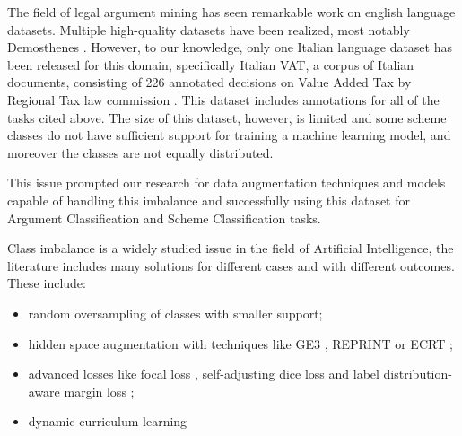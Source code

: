 \documentclass[11pt]{article}
\begin{document}

The field of legal argument mining has seen remarkable work on english language datasets. Multiple high-quality datasets have been realized, most notably Demosthenes \cite{grundler-etal-2022-detecting}.
However, to our knowledge, only one Italian language dataset has been released for this domain, specifically Italian VAT, a corpus of Italian documents, consisting of 226 annotated decisions on Value Added Tax by Regional Tax law commission \cite{galli2022}. This dataset includes annotations for all of the tasks cited above. The size of this dataset, however, is limited and some scheme classes do not have sufficient support for training a machine learning model, and moreover the classes are not equally distributed.

This issue prompted our research for data augmentation techniques and models capable of handling this imbalance and successfully using this dataset for Argument Classification and Scheme Classification tasks.

Class imbalance is a widely studied issue in the field of Artificial Intelligence, the literature includes many solutions for different cases and with different outcomes\cite{henning-etal-2023-survey}. These include:
\begin{itemize}
    \item random oversampling of classes with smaller support;
    \item hidden space augmentation with techniques like GE3 \cite{wei-2021-good}, REPRINT \cite{Wei2022ReprintAR} or ECRT \cite{NEURIPS2021_b151ce49};
    \item advanced losses like focal loss \cite{lin2018focallossdenseobject}, self-adjusting dice loss \cite{li2020dicelossdataimbalancednlp} and label distribution-aware margin loss \cite{cao2019learningimbalanceddatasetslabeldistributionaware};
    \item dynamic curriculum learning \cite{wang2019dynamiccurriculumlearningimbalanced}
\end{itemize}
\end{document}
